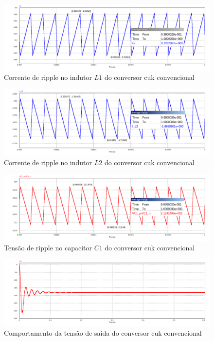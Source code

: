 \documentclass[
	12pt,				%
	openany,
	onseside,
	a4paper,			%
	english,			%
	french,				%
	spanish,			%
	brazil,				%
	]{abntex2}
\begin{document}
\begin{figure}[H]%
	\centering
		\includegraphics[width= \linewidth]{cuk_conv_ripp_I_L1}
		\caption{Corrente de ripple no indutor $L1$ do conversor cuk convencional}
		\label{fig:cuk_conv_ripp_I_L1}
\end{figure}

\begin{figure}[H]%
	\centering
		\includegraphics[width= \linewidth]{cuk_conv_ripp_I_L2}
		\caption{Corrente de ripple no indutor $L2$ do conversor cuk convencional}
		\label{fig:cuk_conv_ripp_I_L2}
\end{figure}

\begin{figure}[H]%
	\centering
		\includegraphics[width= \linewidth]{cuk_conv_ripp_V_C1}
		\caption{Tensão de ripple no capacitor $C1$ do conversor cuk convencional}
		\label{fig:cuk_conv_ripp_V_C1}
\end{figure}

\begin{figure}[H]%
	\centering
		\includegraphics[width= \linewidth]{cuk_conv_V_out}
		\caption{Comportamento da tensão de saída do conversor cuk convencional}
		\label{fig:cuk_conv_V_out}
\end{figure}
\end{document}
